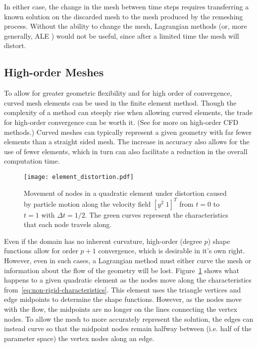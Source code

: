\documentclass[letterpaper,10pt]{article}
\theoremstyle{definition}
\begin{document}
In either case, the change in the
mesh between time steps requires transferring a known solution on the
discarded mesh to the mesh produced by the remeshing process. Without
the ability to change the mesh, Lagrangian methods (or, more generally,
ALE \cite{Hirt1974}) would not be useful, since after a limited time the
mesh will distort.

\subsection{High-order Meshes}

To allow for greater geometric flexibility and for high order of convergence,
curved mesh elements can be used in the finite element method. Though the
complexity of a method can steeply rise when allowing curved elements, the
trade for high-order convergence can be worth it. (See \cite{Wang2013} for
more on high-order CFD methods.) Curved meshes can typically
represent a given geometry with far fewer elements than a straight sided mesh.
The increase in accuracy also allows for the use of fewer elements, which
in turn can also facilitate a reduction in the overall computation time.

\begin{figure}
  \texttt{[image: element\_distortion.pdf]}
  \centering
  \captionsetup{width=.75\linewidth}
  \caption{Movement of nodes in a quadratic element under distortion caused
    by particle motion along the velocity field \(\left[ y^2 \; 1 \right]^T\)
    from \(t = 0\) to \(t = 1\) with \(\Delta t = 1/2\). The green curves
    represent the characteristics that each node travels along.}
  \label{fig:element-distortion}
\end{figure}

Even if the domain has no inherent curvature, high-order (degree \(p\)) shape
functions allow for order \(p + 1\) convergence, which is desirable in
it's own right. However, even in such cases, a Lagrangian method must either
curve the mesh or information about the flow of the geometry will be lost.
Figure~\ref{fig:element-distortion} shows what happens to a given
quadratic element as the nodes move along the
characteristics from~\eqref{eq:non-rigid-characteristics}.
This element uses the triangle vertices and edge
midpoints to determine the shape functions. However, as the nodes move
with the flow, the midpoints are no longer on the lines connecting
the vertex nodes. To allow the mesh to more accurately represent the
solution, the edges can instead curve so that the midpoint nodes remain
halfway between (i.e. half of the parameter space) the vertex nodes along
an edge.
\end{document}
